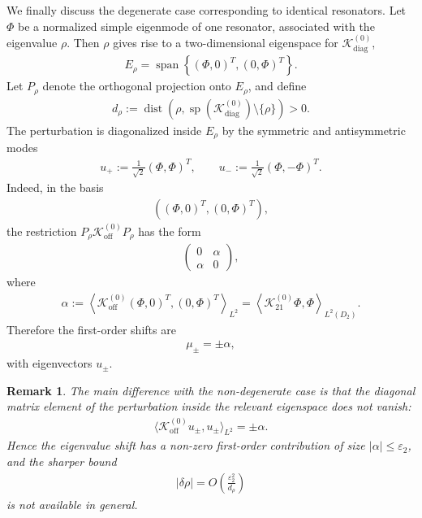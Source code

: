 \documentclass[10pt]{article}
\numberwithin{equation}{section}
\newtheorem*{remark}{Remark}
\begin{document}
We finally discuss the degenerate case corresponding to identical resonators. Let $\Phi$ be a normalized simple eigenmode of one resonator, associated with the eigenvalue $\rho$. Then $\rho$ gives rise to a two-dimensional eigenspace for $\mathcal{K}_{\mathrm{diag}}^{(0)}$,
\begin{align*}
    E_\rho
    =
    \operatorname{span}
    \left\{
    (\Phi,0)^T,
    (0,\Phi)^T
    \right\}.
\end{align*}
Let $P_\rho$ denote the orthogonal projection onto $E_\rho$, and define
\begin{align*}
    d_\rho
    :=
    \operatorname{dist}
    \left(
    \rho,
    \operatorname{sp}(\mathcal{K}_{\mathrm{diag}}^{(0)})\setminus\{\rho\}
    \right)
    >0.
\end{align*}
The perturbation is diagonalized inside $E_\rho$ by the symmetric and antisymmetric modes
\begin{align*}
    u_+
    :=
    \frac{1}{\sqrt2}(\Phi,\Phi)^T,
    \qquad
    u_-
    :=
    \frac{1}{\sqrt2}(\Phi,-\Phi)^T.
\end{align*}
Indeed, in the basis
\begin{align*}
    \left((\Phi,0)^T,(0,\Phi)^T\right),
\end{align*}
the restriction $P_\rho \mathcal{K}_{\mathrm{off}}^{(0)}P_\rho$ has the form
\begin{align*}
    \begin{pmatrix}
        0 & \alpha\\
        \alpha & 0
    \end{pmatrix},
\end{align*}
where
\begin{align*}
    \alpha
    :=
    \left\langle
    \mathcal{K}_{\mathrm{off}}^{(0)}(\Phi,0)^T,
    (0,\Phi)^T
    \right\rangle_{L^2}
    =
    \left\langle
    \mathcal{K}_{21}^{(0)}\Phi,\Phi
    \right\rangle_{L^2(D_2)}.
\end{align*}
Therefore the first-order shifts are
\begin{align*}
    \mu_\pm=\pm\alpha,
\end{align*}
with eigenvectors $u_\pm$.

\begin{remark}
The main difference with the non-degenerate case is that the diagonal matrix element of the perturbation inside the relevant eigenspace does not vanish:
\begin{align*}
    \langle \mathcal{K}_{\mathrm{off}}^{(0)}u_\pm,u_\pm\rangle_{L^2}
    =
    \pm\alpha.
\end{align*}
Hence the eigenvalue shift has a non-zero first-order contribution of size
$|\alpha|\leq \varepsilon_2$, and the sharper bound
\begin{align*}
    |\delta\rho|=O\left(\frac{\varepsilon_2^2}{d_\rho}\right)
\end{align*}
is not available in general.
\end{remark}
\end{document}
